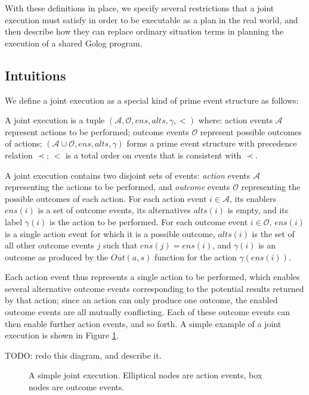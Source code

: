 With these definitions in place, we specify several restrictions that
a joint execution must satisfy in order to be executable as a plan
in the real world, and then describe how they can replace ordinary
situation terms in planning the execution of a shared Golog program.


\subsection{Intuitions}

We define a joint execution\emph{ }as a special kind of prime event
structure as follows:

\begin{defnL}
 A joint execution is a tuple $(\mathcal{A},\mathcal{O},ens,alts,\gamma,<)$
where: action events $\mathcal{A}$ represent actions to be performed;
outcome events $\mathcal{O}$ represent possible outcomes of actions;
$(\mathcal{A}\cup\mathcal{O},ens,alts,\gamma)$ forms a prime event
structure with precedence relation $\prec$; $<$ is a total order
on events that is consistent with $\prec$. 
\end{defnL}
A joint execution contains two disjoint sets of events: \emph{action}
events $\mathcal{A}$ representing the actions to be performed, and
\emph{outcome} events $\mathcal{O}$ representing the possible outcomes
of each action. For each action event $i\in\mathcal{A}$, its enablers
$ens(i)$ is a set of outcome events, its alternatives $alts(i)$
is empty, and its label $\gamma(i)$ is the action to be performed.
For each outcome event $i\in\mathcal{O}$, $ens(i)$ is a single action
event for which it is a possible outcome, $alts(i)$ is the set of
all other outcome events $j$ such that $ens(j)=ens(i)$, and $\gamma(i)$
is an outcome as produced by the $Out(a,s)$ function for the action
$\gamma(ens(i))$.

Each action event thus represents a single action to be performed,
which enables several alternative outcome events corresponding to
the potential results returned by that action; since an action can
only produce one outcome, the enabled outcome events are all mutually
conflicting. Each of these outcome events can then enable further
action events, and so forth. A simple example of a joint execution
is shown in Figure \ref{fig:example-je}.

TODO: redo this diagram, and describe it.

%
\begin{figure}[t]

\caption{ A simple joint execution. Elliptical nodes are action events, box
nodes are outcome events. }


\label{fig:example-je} 
\end{figure}


